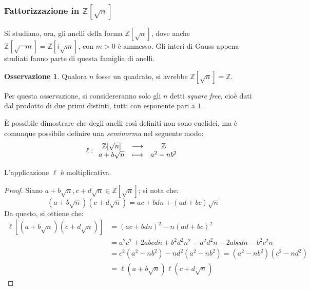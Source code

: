 \documentclass[11pt, a4paper]{scrartcl}
\theoremstyle{definition}
\numberwithin{esempio}{section}
\theoremstyle{definition}
\newtheorem{obs}{Osservazione}
\numberwithin{obs}{section}
\numberwithin{nota}{section}
\numberwithin{equation}{subsection}
\begin{document}
\subsubsection{Fattorizzazione in $\mathbb{Z}[\sqrt{n}]$}
Si studiano, ora, gli anelli della forma $\mathbb{Z}[\sqrt{n} ]$, dove anche $\mathbb{Z}[\sqrt{-m} ] = \mathbb{Z}[i\sqrt{m} ]$, con $m>0$ \`e ammesso.
Gli interi di Gauss appena studiati fanno parte di questa famiglia di anelli.
\begin{obs}
Qualora $n$ fosse un quadrato, si avrebbe $\mathbb{Z}[\sqrt{n} ] = \mathbb{Z}$.
\end{obs}
\noindent Per questa osservazione, si considereranno solo gli $n$ detti \textit{square free}, cio\`e dati dal prodotto di due primi distinti, tutti con esponente pari a $1$.

\`E possibile dimostrare che degli anelli cos\`i definiti non sono euclidei, ma \`e comunque possibile definire una \textit{seminorma} nel seguente modo:
\begin{equation}
	\ell : 
	\begin{array}{c c c}
		\mathbb{Z}[\sqrt{n} ] &\longrightarrow & \mathbb{Z}\\
		a+b \sqrt{n} & \longmapsto & a^2 - nb^2
	\end{array}
\end{equation}
\begin{lemma}
	{}{}
	L'applicazione $\ell $ \`e moltiplicativa.
	\begin{proof}
		Siano $a+b \sqrt{n} , c + d \sqrt{n} \in \mathbb{Z}[\sqrt{n} ]$; si nota che:
		\[
		\left(a + b\sqrt{n} \right) \left(c + d \sqrt{n} \right) = ac + bdn + (ad + bc ) \sqrt{n} 
		\] 
		Da questo, si ottiene che:
\[
	\begin{split}
		\ell \left[ \left(a + b\sqrt{n} \right) \left(c+d\sqrt{n} \right)  \right] &= \left(ac + bdn\right) ^2 - n \left(ad + bc\right) ^2\\
											   &=a^2c^2 + 2 abcdn + b^2 d^2 n^2 - a^2 d^2 n-2abcdn - b^2c^2 n\\
											   &=c^2(a^2-nb^2) - nd^2 (a^2 - nb^2) = (a^2 - nb^2 )(c^2 - nd^2)\\
											   &=\ell \left(a + b\sqrt{n} \right) \ell \left(c+d \sqrt{n} \right) 
	\end{split}
\] 
	\end{proof}
\end{lemma}
\end{document}
